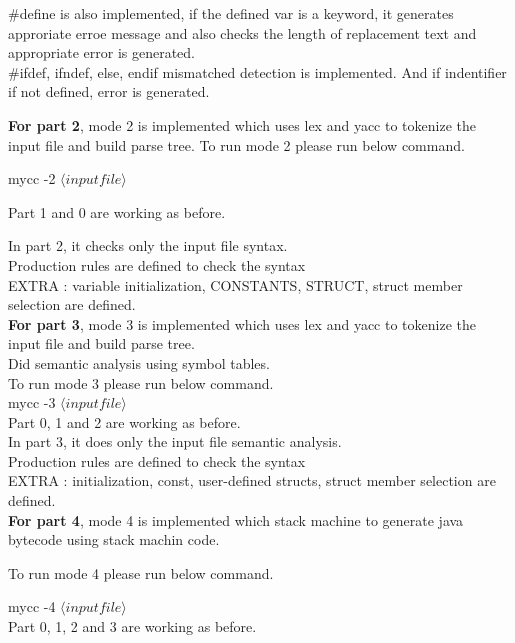 \documentclass{article}
\begin{document}
$\#$define is also implemented, if the defined var is a keyword, it generates approriate erroe message and also checks the length of replacement text and appropriate error is generated. \\

$\#$ifdef, ifndef, else, endif mismatched detection is implemented.
And if indentifier if not defined,  error is generated.

{ \bf For part 2},  mode 2 is implemented which uses lex and yacc to tokenize the input file and build parse tree. To run mode 2 please run below command.

mycc -2 $\langle input file\rangle$

Part 1 and 0 are working as before.

In part 2, it checks only the input file syntax.  \\
Production rules are defined to check the syntax \\
EXTRA : variable initialization, CONSTANTS, STRUCT, struct member selection are defined. \\

{ \bf For part 3},  mode 3 is implemented which uses lex and yacc to tokenize the input file and build parse tree. \\
Did semantic analysis using symbol tables. \\

To run mode 3 please run below command. \\

mycc -3  $\langle input file\rangle$ \\

Part 0, 1 and 2 are working as before. \\

In part 3, it does only the input file semantic analysis. \\
Production rules are defined to check the syntax \\
EXTRA :  initialization, const, user-defined structs, struct member selection are defined. \\

{ \bf For part 4},  mode 4 is implemented which stack machine to generate java bytecode using stack machin code.

To run mode 4 please run below command.

mycc -4  $\langle input file\rangle$ \\

Part 0, 1, 2 and 3 are working as before.
\end{document}
